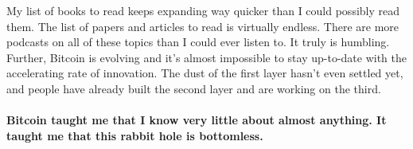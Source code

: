 My list of books to read keeps expanding way quicker than I could
possibly read them. The list of papers and articles to read is virtually
endless. There are more podcasts on all of these topics than I could
ever listen to. It truly is humbling. Further, Bitcoin is evolving and
it's almost impossible to stay up-to-date with the accelerating rate of
innovation. The dust of the first layer hasn't even settled yet, and
people have already built the second layer and are working on the third.

\paragraph{Bitcoin taught me that I know very little about almost anything. It
taught me that this rabbit hole is bottomless.}

%
%
%
%
%
